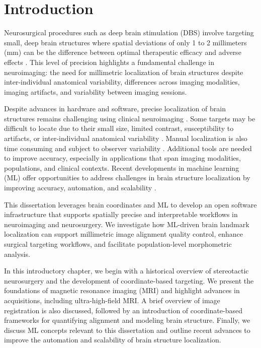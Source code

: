 \chapter{Introduction}\label{chap:intro}
\newpage
\sloppy

Neurosurgical procedures such as deep brain stimulation (DBS) involve targeting small, deep brain structures where spatial deviations of only 1 to 2 millimeters (mm) can be the difference between optimal therapeutic efficacy and adverse effects \cite{Horn2018-qq}. This level of precision highlights a fundamental challenge in neuroimaging: the need for millimetric localization of brain structures despite inter-individual anatomical variability, differences across imaging modalities, imaging artifacts, and variability between imaging sessions.

Despite advances in hardware and software, precise localization of brain structures remains challenging using clinical neuroimaging \cite{Boutet2021-vg}. Some targets may be difficult to locate due to their small size, limited contrast, susceptibility to artifacts, or inter-individual anatomical variability \cite{Lau2020-dh}. Manual localization is also time consuming and subject to observer variability \cite{Miller2023-ct}. Additional tools are needed to improve accuracy, especially in applications that span imaging modalities, populations, and clinical contexts. Recent developments in machine learning (ML) offer opportunities to address challenges in brain structure localization by improving accuracy, automation, and scalability \cite{Andrews2025-kd}.

This dissertation leverages brain coordinates and ML to develop an open software infrastructure that supports spatially precise and interpretable workflows in neuroimaging and neurosurgery. We investigate how ML-driven brain landmark localization can support millimetric image alignment quality control, enhance surgical targeting workflows, and facilitate population-level morphometric analysis.

In this introductory chapter, we begin with a historical overview of stereotactic neurosurgery and the development of coordinate-based targeting. We present the foundations of magnetic resonance imaging (MRI) and highlight advances in acquisitions, including ultra-high-field MRI. A brief overview of image registration is also discussed, followed by an introduction of coordinate-based frameworks for quantifying alignment and modeling brain structure. Finally, we discuss ML concepts relevant to this dissertation and outline recent advances to improve the automation and scalability of brain structure localization.

